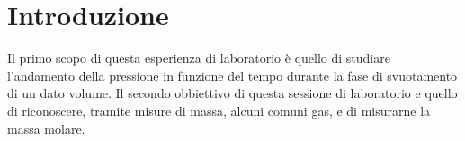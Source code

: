 \section{Introduzione}

Il primo scopo di questa esperienza di laboratorio è quello di studiare l'andamento della pressione
in funzione del tempo durante la fase di svuotamento di un dato volume. Il secondo obbiettivo di
questa sessione di laboratorio e quello di riconoscere, tramite misure di massa, alcuni comuni gas,
e di misurarne la massa molare.
